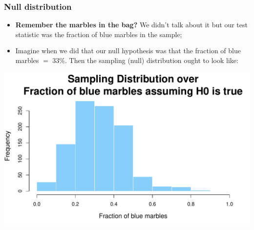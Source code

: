 \documentclass[aspectratio=169]{beamer}
\theoremstyle{principle}
\begin{document}
\begin{frame}
\frametitle{Null distribution}
  
\begin{itemize}
\item \textbf{Remember the marbles in the bag?}  We didn't talk about it but our test statistic was the fraction of blue marbles in the sample;
\bigskip

\item Imagine when we did that our null hypothesis was that the fraction of blue marbles $=$ 33\%.  Then the sampling (null) distribution ought to look like:
\end{itemize}

\begin{center}
\includegraphics[scale=0.4]{null_03.pdf}
\end{center}

\end{frame}
\end{document}
